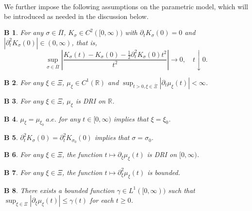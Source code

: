 \documentclass[a4paper,10pt,twoside]{article}
\newtheorem{as}{B}
\numberwithin{equation}{section}
\def\R{\mathbb{R}}
\def\l{\left}
\def\r{\right}
\def\g{\gamma}
\def\s{\sigma}
\def\p{\partial}
\def\ol#1{\overline{#1}}
\begin{document}
We further impose the following assumptions on the parametric model, which will be introduced as needed in the discussion below.

\begin{as}\label{as:K2}
For any $\s\in \ol{\Pi}$,  $K_\s \in C^2([0,\infty))$ with $\p_tK_\s(0) = 0$ and $|\p_t^2 K_\s(0)| \in (0,\infty)$, that is, 
\[
\sup_{\s\in \ol{\Pi}} \l| \frac{K_\s(t) -  K_\s(0) - \frac{1}{2}\p_t^2 K_\s(0) t^2}{t^2}\r| \to 0,\quad t\downarrow 0. 
\]
\end{as}

\begin{as}\label{as:mu}
For any $\xi \in \Xi$, $\mu_\xi \in C^1(\R)$ and $\sup_{t>0,\xi\in \ol{\Xi}}|\p_t \mu_\xi(t)| < \infty$. 
\end{as}

\begin{as}\label{as:DRI-mu}
For any $\xi \in \Xi$, $\mu_\xi$ is DRI on $\R$.
\end{as}

\begin{as}\label{as:id2}
$\mu_\xi = \mu_{\xi_0}\ a.e.$ for any $t\in [0,\infty)$ implies that $\xi = \xi_0$. 
\end{as}

\begin{as}\label{as:id}
$\p^2_t K_\s(0) = \p^2_t K_{\s_0}(0)$ implies that $\s = \s_0$. 
\end{as}

\begin{as}\label{as:DRI-mu2}
For any $\xi \in \Xi$, the function $t \mapsto \partial_\xi \mu_\xi(t)$ is DRI on $[0, \infty)$.
\end{as}

\begin{as}\label{as:DRI-mu4}
For any $\xi \in \Xi$, the function $t \mapsto \partial_\xi^2 \mu_\xi(t)$ is bounded.
\end{as}

\begin{as}\label{as:DRI-mu3}
There exists a bounded function $\g \in L^1([0,\infty))$ such that $\sup_{\xi \in \Xi} |\partial_\xi \mu_\xi(t)|\le \g(t)$ for each $t\ge 0$.
\end{as}
\end{document}
